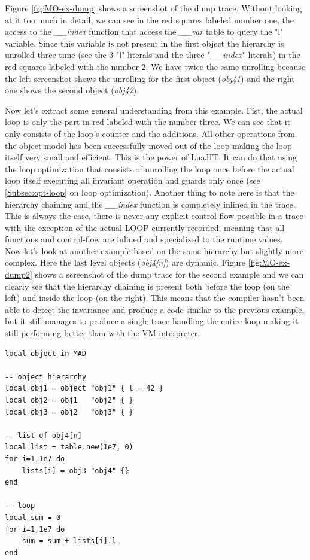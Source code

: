 Figure \ref{fig:MO-ex-dump} shows a screenshot of the dump trace. Without looking
at it too much in detail, we can see in the red squares labeled number one, the
access to the \emph{\_\_index} function that access the \emph{\_\_var} table to
query the "l" variable. Since this variable is not present in the first object
the hierarchy is unrolled three time (see the 3 "l" literals and the three
"\emph{\_\_index}" literals) in the red squares labeled with the number 2.
We have twice the same unrolling because the left screenshot shows the
unrolling for the first object (\emph{obj41}) and the right one shows the second
object (\emph{obj42}).

Now let's extract some general understanding from this example. Fist, the actual loop
is only the part in red labeled with the number three. We can see that it only
consists of the loop's counter and the additions. All other operations
from the object model has been successfully moved out of the loop making the loop
itself very small and efficient. This is the power of LuaJIT. It can do that
using the loop optimization that consists of unrolling the loop once before the
actual loop itself executing all invariant operation and guards only once
(see \ref{Subsec:opt-loop} on loop optimization). Another thing to note here is
that the hierarchy chaining and the \emph{\_\_index} function is completely
inlined in the trace. This is always the case, there is never any explicit
control-flow possible in a trace with the exception of the actual LOOP currently
recorded, meaning that all functions and control-flow are inlined and specialized
to the runtime values.\\

Now let's look at another example based on the same hierarchy but slightly more
complex. Here the last level objects (\emph{obj4[n]}) are dynamic. Figure
\ref{fig:MO-ex-dump2} shows a screenshot of the dump trace for the second
example and we can clearly see that the hierarchy chaining is present both before
the loop (on the left) and inside the loop (on the right). This means that the
compiler hasn't been able to detect the invariance and produce a code similar to
the previous example, but it still manages to produce a single trace handling the
entire loop making it still performing better than with the VM interpreter.

\begin{lstlisting}[style=LuaStyle]
local object in MAD

-- object hierarchy
local obj1 = object "obj1" { l = 42 }
local obj2 = obj1   "obj2" { }
local obj3 = obj2   "obj3" { }

-- list of obj4[n]
local list = table.new(1e7, 0)
for i=1,1e7 do
	lists[i] = obj3 "obj4" {}
end

-- loop
local sum = 0
for i=1,1e7 do
	sum = sum + lists[i].l
end
\end{lstlisting}

